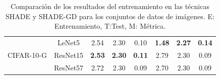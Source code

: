 \begin{table}[]
\begin{tabular}{|c|c|ccc|ccc|}
\multirow{3}{*}{CIFAR-10-G}            & LeNet5                          & \multicolumn{1}{c|}{2.54}          & \multicolumn{1}{c|}{2.30}          & 0.10          & \multicolumn{1}{c|}{\textbf{1.48}} & \multicolumn{1}{c|}{\textbf{2.27}} & \textbf{0.14}  \\ \cline{2-8} 
                                  & ResNet15                        & \multicolumn{1}{c|}{\textbf{2.53}} & \multicolumn{1}{c|}{\textbf{2.30}} & \textbf{0.11} & \multicolumn{1}{c|}{2.79}          & \multicolumn{1}{c|}{2.30}          & 0.09           \\ \cline{2-8} 
                                  & ResNet57                        & \multicolumn{1}{c|}{2.72}          & \multicolumn{1}{c|}{2.30}          & 0.09          & \multicolumn{1}{c|}{2.70}          & \multicolumn{1}{c|}{2.30}          & 0.09           \\ \hline
\end{tabular}
\caption{Comparación de los resultados del entrenamiento en las técnicas SHADE y SHADE-GD para los conjuntos de datos de imágenes. E: Entrenamiento, T:Test, M: Métrica.}
\label{tab:shadevsshadegd_im}
\end{table}


